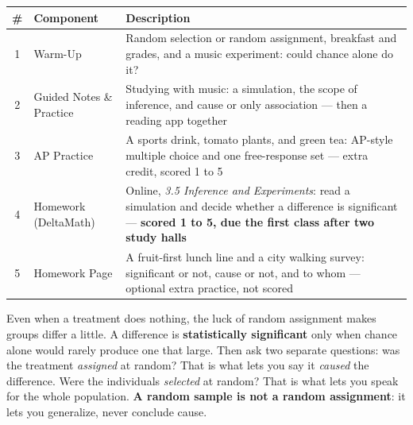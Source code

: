 \documentclass[12pt]{article}
\begin{document}
\boxguard[14]
\begin{tocbox}
\small
\renewcommand{\arraystretch}{1.5}
\begin{tabularx}{\linewidth}{@{} c l X @{}}
\rowcolor{sky}
\textbf{\#} & \textbf{Component} & \textbf{Description} \\
\midrule
1 & Warm-Up & Random selection or random assignment, breakfast and grades, and a music
                 experiment: could chance alone do it? \\
2 & Guided Notes \& Practice & Studying with music: a simulation, the scope of inference, and
                 cause or only association --- then a reading app together \\
3 & AP Practice & A sports drink, tomato plants, and green tea: AP-style multiple choice and
                 one free-response set --- extra credit, scored 1 to 5 \\
4 & Homework (DeltaMath) & Online, \emph{3.5 Inference and Experiments}: read a simulation and
                 decide whether a difference is significant --- \textbf{scored 1 to 5, due the first class after two study halls} \\
5 & Homework Page & A fruit-first lunch line and a city walking survey: significant or not, cause
                 or not, and to whom --- optional extra practice, not scored \\
\end{tabularx}
\end{tocbox}

\vspace{0.14in}

\boxguard[8]
\begin{remindbox}
\small
Even when a treatment does nothing, the luck of random assignment makes groups differ a
little. A difference is \textbf{statistically significant} only when chance alone would
rarely produce one that large. Then ask two separate questions: was the treatment
\emph{assigned} at random? That is what lets you say it \emph{caused} the difference. Were the
individuals \emph{selected} at random? That is what lets you speak for the whole population.
\textbf{A random sample is not a random assignment}: it lets you generalize, never conclude
cause.
\end{remindbox}
\end{document}
